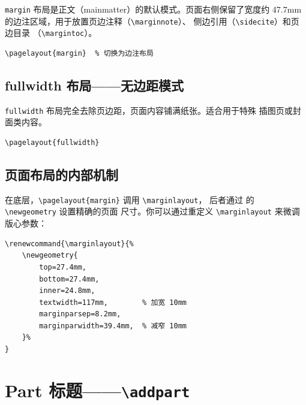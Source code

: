 \texttt{margin} 布局是正文（mainmatter）的默认模式。页面右侧保留了宽度约
47.7mm 的边注区域，用于放置页边注释（\texttt{\textbackslash marginnote}）、
侧边引用（\texttt{\textbackslash sidecite}）和页边目录
（\texttt{\textbackslash margintoc}）。

\begin{lstlisting}
\pagelayout{margin}  % 切换为边注布局
\end{lstlisting}

\subsection{fullwidth 布局——无边距模式}

\texttt{fullwidth} 布局完全去除页边距，页面内容铺满纸张。适合用于特殊
插图页或封面类内容。

\begin{lstlisting}
\pagelayout{fullwidth}
\end{lstlisting}

\subsection{页面布局的内部机制}

在底层，\lstinline|\pagelayout{margin}| 调用 \lstinline|\marginlayout|，
后者通过  的 \lstinline|\newgeometry| 设置精确的页面
尺寸。你可以通过重定义 \lstinline|\marginlayout| 来微调版心参数：

\begin{lstlisting}
\renewcommand{\marginlayout}{%
    \newgeometry{
        top=27.4mm,
        bottom=27.4mm,
        inner=24.8mm,
        textwidth=117mm,        % 加宽 10mm
        marginparsep=8.2mm,
        marginparwidth=39.4mm,  % 减窄 10mm
    }%
}
\end{lstlisting}



\section{Part 标题——\texttt{\textbackslash addpart}}


